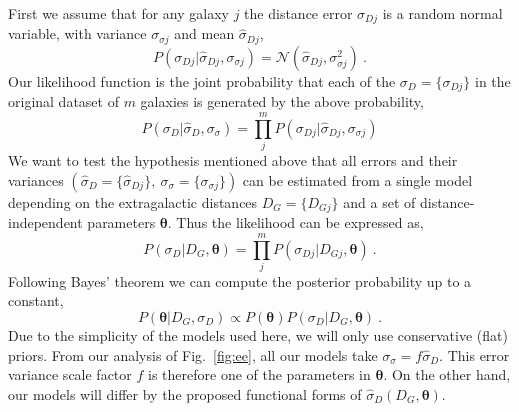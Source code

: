 \documentclass[a4paper,fleqn,usenatbib]{mnras}
\begin{document}
First we assume that for any galaxy $j$ the distance error $\sigma_{Dj}$ is a random normal variable, with variance $\sigma_{\sigma j}$ and mean $\hat{\sigma}_{Dj}$, 
\begin{equation}
P(\sigma_{Dj}|\hat{\sigma}_{Dj},\sigma_{\sigma j})=\mathcal{N}(\hat{\sigma}_{Dj},\sigma_{\sigma j}^2)\ .
	\label{eq:prob}
\end{equation}
Our likelihood function is the joint probability that each of the $\sigma_D=\{\sigma_{Dj}\}$ in the original dataset of $m$ galaxies is generated by the above probability,  
\begin{equation}
 P(\sigma_{D}|\hat{\sigma}_{D},\sigma_{\sigma})=\prod_j^mP(\sigma_{Dj}|\hat{\sigma}_{Dj},\sigma_{\sigma j})
\end{equation}
We want to test the hypothesis mentioned above that all errors and their variances $(\hat{\sigma}_D=\{\hat{\sigma}_{Dj}\},\ \sigma_\sigma=\{\sigma_{\sigma j}\})$ can be estimated from a single model depending on the extragalactic distances $D_G=\{D_{Gj}\}$ and a set of distance-independent parameters $\pmb{\theta}$. Thus the likelihood can be expressed as,
\[P(\sigma_D|D_G,\pmb{\theta})=\prod_j^mP(\sigma_{Dj}|D_{Gj},\pmb{\theta})\ .\]
Following Bayes' theorem we can compute the posterior probability up to a constant,
\begin{equation}
P(\pmb{\theta}|D_G,\sigma_D)\propto P(\pmb{\theta})P(\sigma_D|D_G,\pmb{\theta})\ .
	\label{eq:ppd}
\end{equation}
Due to the simplicity of the models used here, we will only use conservative (flat) priors. From our analysis of Fig.~\ref{fig:ee}, all our models take $\sigma_\sigma=f\hat{\sigma}_D$. This error variance scale factor $f$ is therefore one of the parameters in $\pmb{\theta}$. On the other hand, our models will differ by the proposed functional forms of $\hat{\sigma}_D(D_G,\pmb{\theta})$.\\
\end{document}
